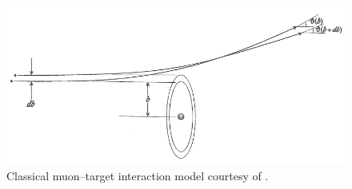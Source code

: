 \begin{figure}
  \centering
  \includegraphics[width=\textwidth]{Figures/scattering_model} 

  \caption{Classical muon--target interaction model courtesy of \cite{jose}.}
  \label{fig:scatteringmodel}
\end{figure}

